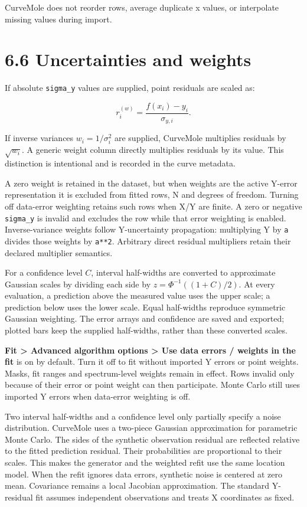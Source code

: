 \documentclass[
  10pt,
  a4paper,
  oneside]{scrreprt}
\begin{document}
CurveMole does not reorder rows, average duplicate x values, or
interpolate missing values during import.

\hypertarget{uncertainties-and-weights}{%
\section{6.6 Uncertainties and
weights}\label{uncertainties-and-weights}}

If absolute \texttt{sigma\_y} values are supplied, point residuals are
scaled as:

\[
r_i^{(w)} = \frac{f(x_i)-y_i}{\sigma_{y,i}}.
\]

If inverse variances \(w_i=1/\sigma_i^2\) are supplied, CurveMole
multiplies residuals by \(\sqrt{w_i}\). A generic weight column directly
multiplies residuals by its value. This distinction is intentional and
is recorded in the curve metadata.

A zero weight is retained in the dataset, but when weights are the
active Y-error representation it is excluded from fitted rows, N and
degrees of freedom. Turning off data-error weighting retains such rows
when X/Y are finite. A zero or negative \texttt{sigma\_y} is invalid and
excludes the row while that error weighting is enabled. Inverse-variance
weights follow Y-uncertainty propagation: multiplying Y by \texttt{a}
divides those weights by \texttt{a**2}. Arbitrary direct residual
multipliers retain their declared multiplier semantics.

For a confidence level \(C\), interval half-widths are converted to
approximate Gaussian scales by dividing each side by
\(z=\Phi^{-1}((1+C)/2)\). At every evaluation, a prediction above the
measured value uses the upper scale; a prediction below uses the lower
scale. Equal half-widths reproduce symmetric Gaussian weighting. The
error arrays and confidence are saved and exported; plotted bars keep
the supplied half-widths, rather than these converted scales.

\textbf{Fit \textgreater{} Advanced algorithm options \textgreater{} Use
data errors / weights in the fit} is on by default. Turn it off to fit
without imported Y errors or point weights. Masks, fit ranges and
spectrum-level weights remain in effect. Rows invalid only because of
their error or point weight can then participate. Monte Carlo still uses
imported Y errors when data-error weighting is off.

Two interval half-widths and a confidence level only partially specify a
noise distribution. CurveMole uses a two-piece Gaussian approximation
for parametric Monte Carlo. The sides of the synthetic observation
residual are reflected relative to the fitted prediction residual. Their
probabilities are proportional to their scales. This makes the generator
and the weighted refit use the same location model. When the refit
ignores data errors, synthetic noise is centered at zero mean.
Covariance remains a local Jacobian approximation. The standard
Y-residual fit assumes independent observations and treats X coordinates
as fixed.
\end{document}
